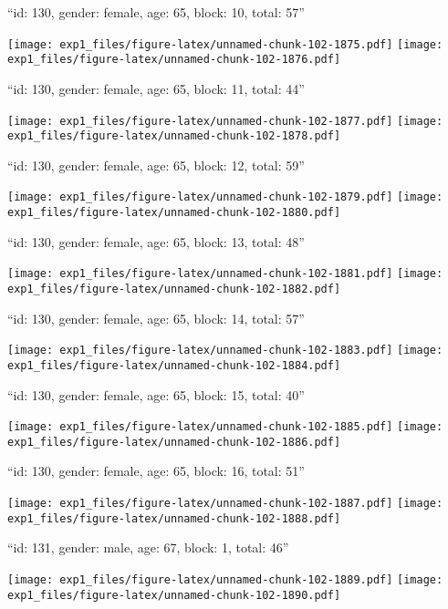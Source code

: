 \documentclass[11pt,,]{article}
\begin{document}
\newpage
[1] 

``id: 130, gender: female, age: 65, block: 10, total: 57''

\texttt{[image: exp1\_files/figure-latex/unnamed-chunk-102-1875.pdf]}
\texttt{[image: exp1\_files/figure-latex/unnamed-chunk-102-1876.pdf]}

\newpage
[1] 

``id: 130, gender: female, age: 65, block: 11, total: 44''

\texttt{[image: exp1\_files/figure-latex/unnamed-chunk-102-1877.pdf]}
\texttt{[image: exp1\_files/figure-latex/unnamed-chunk-102-1878.pdf]}

\newpage
[1] 

``id: 130, gender: female, age: 65, block: 12, total: 59''

\texttt{[image: exp1\_files/figure-latex/unnamed-chunk-102-1879.pdf]}
\texttt{[image: exp1\_files/figure-latex/unnamed-chunk-102-1880.pdf]}

\newpage
[1] 

``id: 130, gender: female, age: 65, block: 13, total: 48''

\texttt{[image: exp1\_files/figure-latex/unnamed-chunk-102-1881.pdf]}
\texttt{[image: exp1\_files/figure-latex/unnamed-chunk-102-1882.pdf]}

\newpage
[1] 

``id: 130, gender: female, age: 65, block: 14, total: 57''

\texttt{[image: exp1\_files/figure-latex/unnamed-chunk-102-1883.pdf]}
\texttt{[image: exp1\_files/figure-latex/unnamed-chunk-102-1884.pdf]}

\newpage
[1] 

``id: 130, gender: female, age: 65, block: 15, total: 40''

\texttt{[image: exp1\_files/figure-latex/unnamed-chunk-102-1885.pdf]}
\texttt{[image: exp1\_files/figure-latex/unnamed-chunk-102-1886.pdf]}

\newpage
[1] 

``id: 130, gender: female, age: 65, block: 16, total: 51''

\texttt{[image: exp1\_files/figure-latex/unnamed-chunk-102-1887.pdf]}
\texttt{[image: exp1\_files/figure-latex/unnamed-chunk-102-1888.pdf]}

\newpage
[1] 

``id: 131, gender: male, age: 67, block: 1, total: 46''

\texttt{[image: exp1\_files/figure-latex/unnamed-chunk-102-1889.pdf]}
\texttt{[image: exp1\_files/figure-latex/unnamed-chunk-102-1890.pdf]}
\end{document}
